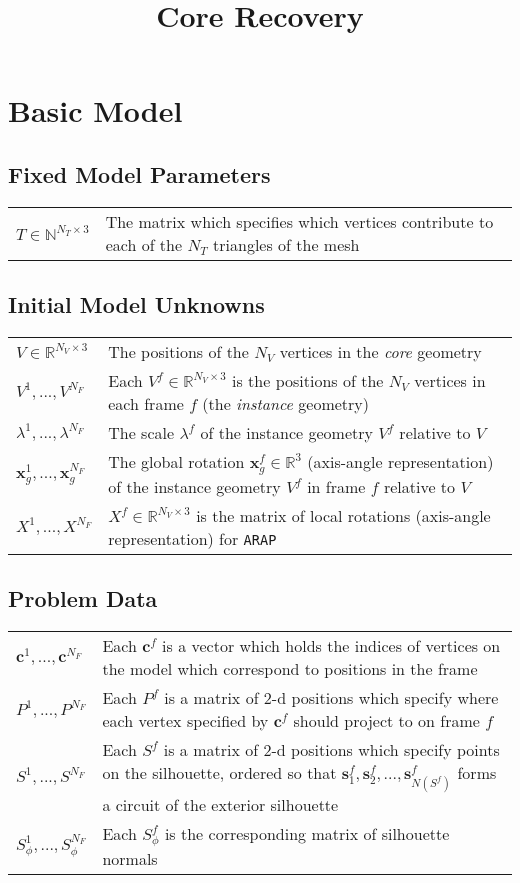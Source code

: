 \documentclass[a4paper,10pt]{article}
\title{Core Recovery}
\author{}
\newcommand{\mb}{\mathbf}
\begin{document}
\maketitle

\section{Basic Model}
\label{sec:basic_model}

\subsection{Fixed Model Parameters}
\begin{tabularx}{\textwidth}{ l | X}
$T \in \mathbb{N}^{N_T \times 3}$ & The matrix which specifies which vertices contribute to each of the $N_T$ triangles of the mesh \\
\end{tabularx}

\subsection{Initial Model Unknowns}
\begin{tabularx}{\textwidth}{ l | X}
$V \in \mathbb{R}^{N_V \times 3}$  & The positions of the $N_V$ vertices in the \emph{core} geometry \\
$V^1, ..., V^{N_F}$ & Each  $V^f \in \mathbb{R}^{N_V \times 3}$ is the positions of the $N_V$ vertices in each frame $f$ (the \emph{instance} geometry) \\
$\lambda^1, ..., \lambda^{N_F}$ & The scale $\lambda^f$ of the instance geometry $V^f$ relative to $V$ \\
$\mb{x}_g^1, ..., \mb{x}_g^{N_F}$ & The global rotation $\mb{x}_g^f \in \mathbb{R}^3$ (axis-angle representation) of the instance geometry $V^f$ in frame $f$ relative to $V$ \\
$X^1, ..., X^{N_F}$ & $X^f \in \mathbb{R}^{N_V \times 3}$ is the matrix of local rotations (axis-angle representation) for \texttt{ARAP} \\
\end{tabularx}

\subsection{Problem Data}
\begin{tabularx}{\textwidth}{ l | X}
$\mb{c}^1, ..., \mb{c}^{N_F}$ & Each $\mb{c}^f$ is a vector which holds the indices of vertices on the model which correspond to positions in the frame \\
$P^1, ..., P^{N_F}$ & Each $P^f$ is a matrix of 2-d positions which specify where each vertex specified by $\mb{c}^f$ should project to on frame $f$ \\
$S^1, ..., S^{N_F}$ & Each $S^f$ is a matrix of 2-d positions which specify points on the silhouette, ordered so that $\mb{s}^f_1, \mb{s}^f_2, ..., \mb{s}^f_{N({S^f})}$ forms a circuit of the exterior silhouette \\
$S_\phi^1, ..., S_\phi^{N_F}$ & Each $S_\phi^f$ is the corresponding matrix of silhouette normals
\end{tabularx}
\end{document}
